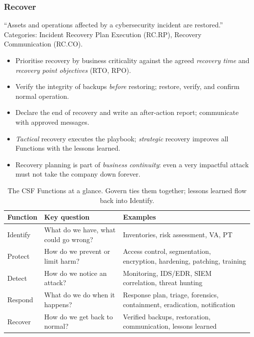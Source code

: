 \subsubsection{Recover}
\enquote{Assets and operations affected by a cybersecurity incident are restored.} Categories: Incident Recovery Plan Execution (RC.RP), Recovery Communication (RC.CO).
\begin{itemize}
    \item Prioritise recovery by business criticality against the agreed \emph{recovery time} and \emph{recovery point objectives} (RTO, RPO).
    \item Verify the integrity of backups \emph{before} restoring; restore, verify, and confirm normal operation.
    \item Declare the end of recovery and write an after-action report; communicate with approved messages.
    \item \emph{Tactical} recovery executes the playbook; \emph{strategic} recovery improves all Functions with the lessons learned.
    \item Recovery planning is part of \emph{business continuity}: even a very impactful attack must not take the company down forever.
\end{itemize}

\begin{table}[H]
\centering
\caption{The CSF Functions at a glance. Govern ties them together; lessons learned flow back into Identify.}
\label{tab:csf}
\begin{tabularx}{\textwidth}{@{}l l X@{}}
\toprule
Function & Key question & Examples \\
\midrule
Identify & What do we have, what could go wrong? & Inventories, risk assessment, VA, PT \\
Protect  & How do we prevent or limit harm?      & Access control, segmentation, encryption, hardening, patching, training \\
Detect   & How do we notice an attack?           & Monitoring, IDS/EDR, SIEM correlation, threat hunting \\
Respond  & What do we do when it happens?        & Response plan, triage, forensics, containment, eradication, notification \\
Recover  & How do we get back to normal?         & Verified backups, restoration, communication, lessons learned \\
\bottomrule
\end{tabularx}
\end{table}

